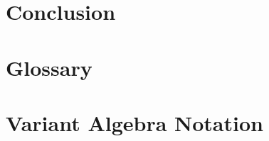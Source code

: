 \documentclass[a4paper, 10pt]{article}
\begin{document}
\section{Conclusion}
\label{section:Conclusion}

\newpage
%
\printbibliography
\newpage
%
\begin{appendix}
    \section{Glossary}
    \label{appendix:Glossary}
    \printglossaries
    \newpage
    \section{Variant Algebra Notation}
    \label{appendix:Notation}
    
\end{appendix}
%
\end{document}
